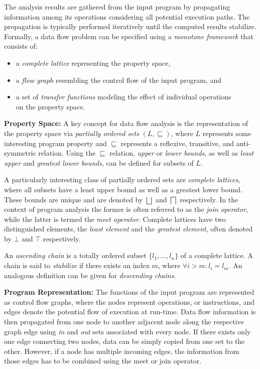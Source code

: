 The analysis results are gathered from the input program by propagating
information among its operations considering all potential execution paths. The
propagation is typically performed iteratively until the computed results
stabilize. Formally, a data flow problem can be specified using a \emph{monotone
framework} that consists of:
\begin{itemize}
  \item a \emph{complete lattice} representing the property space,
  \item a \emph{flow graph} resembling the control flow of the input program, 
        and
  \item a set of \emph{transfer functions} modeling the effect of individual
        operations \\ on the property space.
\end{itemize}

\textbf{Property Space:}
A key concept for data flow analysis is the representation of the property space
via \emph{partially ordered sets} $(L, \sqsubseteq)$, where $L$ represents some
interesting program property and $\sqsubseteq$ represents a reflexive, transitive, and
anti-symmetric relation. Using the $\sqsubseteq$ relation, \emph{upper} or
\emph{lower bounds}, as well as \emph{least upper} and \emph{greatest lower
bounds}, can be defined for subsets of $L$.

A particularly interesting class of partially ordered sets are \emph{complete
lattices}, where all subsets have a least upper bound as well as a greatest
lower bound. These bounds are unique and are denoted by $\bigsqcup$ and
$\bigsqcap$ respectively. In the context of program analysis the former is often
referred to as the \emph{join operator}, while the latter is termed the
\emph{meet operator}. Complete lattices have two distinguished elements, the
\emph{least element} and the \emph{greatest element}, often denoted by $\bot$
and $\top$ respectively.

An \emph{ascending chain} is a totally ordered subset $\{l_1, \ldots, l_n \}$ of
a complete lattice. A chain is said to \emph{stabilize} if there exists an index
$m$, where $\forall i > m \colon l_i = l_m$. An analogous definition can be
given for \emph{descending chains}.

\textbf{Program Representation:}
The functions of the input program are represented as control flow graphs, where
the nodes represent operations, or instructions, and edges denote the potential
flow of execution at run-time.
Data flow information is then propagated from one node to
another adjacent node along the respective graph edge using \emph{in} and
\emph{out} sets associated with every node. If there exists only one edge
connecting two nodes, data can be simply copied from one set to the other.
However, if a node has multiple incoming edges, the information from
those edges has to be combined using the meet or join operator.

